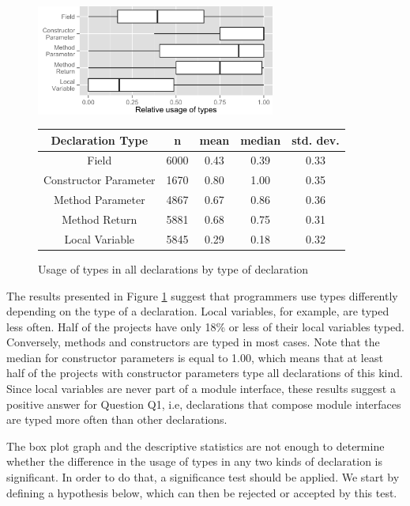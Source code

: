 \documentclass[msc]{ppgccufmg}
\renewcommand{\arraystretch}{1.2}
\begin{document}
\begin{figure}[h]
\centering 
\includegraphics[width=0.7\textwidth]{../aosd_2014/analysis/result/all/boxplots/6_declarations_by_type.png} 
\vspace{0.3cm}

\renewcommand{\arraystretch}{1.2}

\begin{tabular}{|c|c|c|c|c|}
\hline
Declaration Type		& n		& mean	& median		& std. dev.	\\
\hline
\hline
Field					& 6000	& 0.43	& 0.39		& 0.33		\\ \hline
Constructor Parameter	& 1670	& 0.80	& 1.00		& 0.35		\\ \hline
Method Parameter		& 4867	& 0.67	& 0.86		& 0.36		\\ \hline
Method Return			& 5881	& 0.68	& 0.75		& 0.31		\\ \hline
Local Variable			& 5845	& 0.29	& 0.18		& 0.32		\\ \hline
\end{tabular}

\caption{Usage of types in all declarations by type of declaration}
\label{fig:all_boxplot_type} 
\end{figure}



The results presented in Figure \ref{fig:all_boxplot_type} suggest that programmers use types differently depending on the type of a declaration.
Local variables, for example, are typed less often.
Half of the projects have only 18\% or less of their local variables typed.
Conversely, methods and constructors are typed in most cases.
Note that the median for constructor parameters is equal to 1.00, which means that at least half of the projects with constructor parameters type all declarations of this kind.
Since local variables are never part of a module interface, these results suggest a positive answer for Question Q1, i.e, declarations that compose module interfaces are typed more often than other declarations.

The box plot graph and the descriptive statistics are not enough to determine whether the difference in the usage of types in any two kinds of declaration is significant.
In order to do that, a significance test should be applied. 
We start by defining a hypothesis below, which can then be rejected or accepted by this test.
\end{document}
